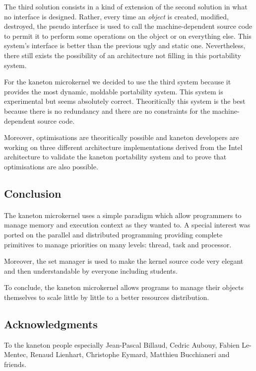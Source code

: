 \begin{multicols}{2}
The third solution consists in a kind of extension of the second solution
in what no interface is designed. Rather, every time an \textit{object} is
created, modified, destroyed, the pseudo interface is used to call the
machine-dependent source code to permit it to perform some operations
on the object or on everything else. This system's interface is better
than the previous ugly and static one. Nevertheless, there still exists the
possibility of an architecture not filling in this portability system.

For the kaneton microkernel we decided to use the third system because
it provides the most dynamic, moldable portability system. This system is
experimental but seems absolutely correct. Theoritically this system
is the best because there is no redundancy and there are no constraints
for the machine-dependent source code.

Moreover, optimisations are theoritically possible and kaneton developers
are working on three different architecture implementations derived from
the Intel architecture to validate the kaneton portability system and to
prove that optimisations are also possible.

%
%

\subsection{Conclusion}

\paragraph{}

The kaneton microkernel uses a simple paradigm which allow programmers to
manage memory and execution context as they wanted to. A special interest
was ported on the parallel and distributed programming providing complete
primitives to manage priorities on many levels: thread, task and processor.

Moreover, the set manager is used to make the kernel source code very elegant
and then understandable by everyone including students.

To conclude, the kaneton microkernel allows programs to manage their objects
themselves to scale little by little to a better resources distribution.

%
%

\subsection{Acknowledgments}

To the kaneton people especially Jean-Pascal Billaud, Cedric Aubouy,
Fabien Le-Mentec, Renaud Lienhart, Christophe Eymard, Matthieu Bucchianeri
and friends.

\end{multicols}


